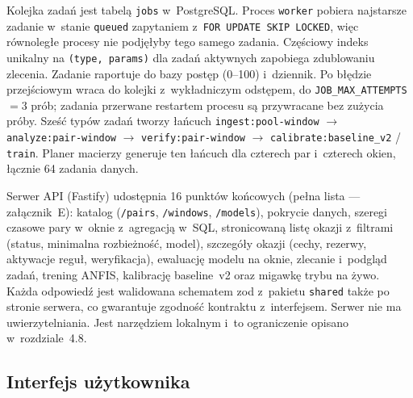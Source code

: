 Kolejka zadań jest tabelą \texttt{jobs} w~PostgreSQL. Proces \texttt{worker} pobiera najstarsze
zadanie w~stanie \texttt{queued} zapytaniem z~\texttt{FOR UPDATE SKIP LOCKED}, więc równoległe
procesy nie podjęłyby tego samego zadania. Częściowy indeks unikalny na \texttt{(type, params)}
dla zadań aktywnych zapobiega zdublowaniu zlecenia. Zadanie raportuje do bazy postęp (0--100)
i~dziennik. Po błędzie przejściowym wraca do kolejki z~wykładniczym odstępem, do
\texttt{JOB\_MAX\_ATTEMPTS} $=3$ prób; zadania przerwane restartem procesu są przywracane bez
zużycia próby. Sześć typów zadań tworzy łańcuch \texttt{ingest:pool-window} $\rightarrow$
\texttt{analyze:pair-window} $\rightarrow$ \texttt{verify:pair-window} $\rightarrow$
\texttt{calibrate:baseline\_v2} / \texttt{train}. Planer macierzy generuje ten łańcuch dla
czterech par i~czterech okien, łącznie 64 zadania danych.

Serwer API (Fastify) udostępnia 16 punktów końcowych (pełna lista --- załącznik~E): katalog (\texttt{/pairs},
\texttt{/windows}, \texttt{/models}), pokrycie danych, szeregi czasowe pary w~oknie z~agregacją
w~SQL, stronicowaną listę okazji z~filtrami (status, minimalna rozbieżność, model), szczegóły
okazji (cechy, rezerwy, aktywacje reguł, weryfikacja), ewaluację modelu na oknie, zlecanie
i~podgląd zadań, trening ANFIS, kalibrację baseline~v2 oraz migawkę trybu na żywo. Każda
odpowiedź jest walidowana schematem zod z~pakietu \texttt{shared} także po stronie serwera, co
gwarantuje zgodność kontraktu z~interfejsem. Serwer nie ma uwierzytelniania. Jest narzędziem
lokalnym i~to ograniczenie opisano w~rozdziale~4.8.

\subsection{Interfejs użytkownika}

